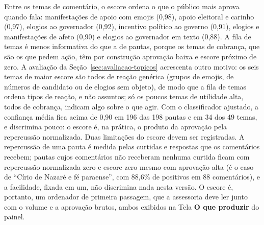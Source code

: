 Entre os temas de comentário, o escore ordena o que o público mais aprova quando fala: manifestações de apoio com emojis (0,98), apoio eleitoral e carinho (0,97), elogios ao governador (0,92), incentivo político ao governo (0,91), elogios e manifestações de afeto (0,90) e elogios ao governador em texto (0,88). A fila de temas é menos informativa do que a de pautas, porque os temas de cobrança, que são os que pedem ação, têm por construção aprovação baixa e escore próximo de zero. A avaliação da Seção~\ref{sec:avaliacao-topicos} acrescenta outro motivo: os seis temas de maior escore são todos de reação genérica (grupos de emojis, de números de candidato ou de elogios sem objeto), de modo que a fila de temas ordena tipos de reação, e não assuntos; só os poucos temas de utilidade alta, todos de cobrança, indicam algo sobre o que agir. Com o classificador ajustado, a confiança média fica acima de 0,90 em 196 das 198 pautas e em 34 dos 49 temas, e discrimina pouco: o escore é, na prática, o produto da aprovação pela repercussão normalizada. Duas limitações do escore devem ser registradas. A repercussão de uma pauta é medida pelas curtidas e respostas que os comentários recebem; pautas cujos comentários não receberam nenhuma curtida ficam com repercussão normalizada zero e escore zero mesmo com aprovação alta (é o caso de ``Círio de Nazaré e fé paraense'', com 88,6\% de positivos em 88 comentários), e a facilidade, fixada em um, não discrimina nada nesta versão. O escore é, portanto, um ordenador de primeira passagem, que a assessoria deve ler junto com o volume e a aprovação brutos, ambos exibidos na Tela \textbf{O que produzir} do painel.

